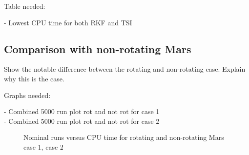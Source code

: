 Table needed:

- Lowest CPU time for both RKF and TSI \\



\subsection{Comparison with non-rotating Mars}
\label{subsec:timeCompNotRot}
Show the notable difference between the rotating and non-rotating case. Explain why this is the case.

Graphs needed:

- Combined 5000 run plot rot and not rot for case 1 \\
- Combined 5000 run plot rot and not rot for case 2 \\


\begin{figure}
\centering
{} 
\caption{Nominal runs versus CPU time for rotating and non-rotating Mars \protect{} case 1,  \protect{} case 2 } 
\label{fig:multiRunVsCPUcase1combinedSmall} 
\end{figure} 



